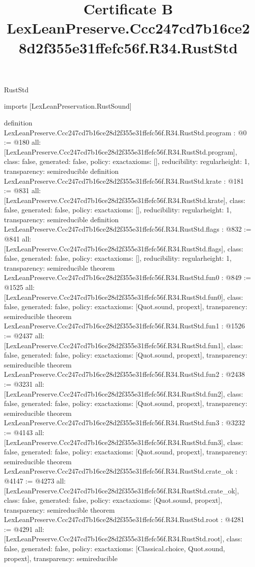 \begin{lexlean}{RustStd}
\title{Certificate B LexLeanPreserve.Ccc247cd7b16ce28d2f355e31ffefc56f.R34.RustStd}
\begin{coremodule}
imports [LexLeanPreservation.RustSound]

definition LexLeanPreserve.Ccc247cd7b16ce28d2f355e31ffefc56f.R34.RustStd.program : @0 := @180 {
  all: [LexLeanPreserve.Ccc247cd7b16ce28d2f355e31ffefc56f.R34.RustStd.program],
  class: false,
  generated: false,
  policy: exact{axioms: []},
  reducibility: regular{height: 1},
  transparency: semireducible
}
definition LexLeanPreserve.Ccc247cd7b16ce28d2f355e31ffefc56f.R34.RustStd.krate : @181 := @831 {
  all: [LexLeanPreserve.Ccc247cd7b16ce28d2f355e31ffefc56f.R34.RustStd.krate],
  class: false,
  generated: false,
  policy: exact{axioms: []},
  reducibility: regular{height: 1},
  transparency: semireducible
}
definition LexLeanPreserve.Ccc247cd7b16ce28d2f355e31ffefc56f.R34.RustStd.flags : @832 := @841 {
  all: [LexLeanPreserve.Ccc247cd7b16ce28d2f355e31ffefc56f.R34.RustStd.flags],
  class: false,
  generated: false,
  policy: exact{axioms: []},
  reducibility: regular{height: 1},
  transparency: semireducible
}
theorem LexLeanPreserve.Ccc247cd7b16ce28d2f355e31ffefc56f.R34.RustStd.fun0 : @849 := @1525 {
  all: [LexLeanPreserve.Ccc247cd7b16ce28d2f355e31ffefc56f.R34.RustStd.fun0],
  class: false,
  generated: false,
  policy: exact{axioms: [Quot.sound, propext]},
  transparency: semireducible
}
theorem LexLeanPreserve.Ccc247cd7b16ce28d2f355e31ffefc56f.R34.RustStd.fun1 : @1526 := @2437 {
  all: [LexLeanPreserve.Ccc247cd7b16ce28d2f355e31ffefc56f.R34.RustStd.fun1],
  class: false,
  generated: false,
  policy: exact{axioms: [Quot.sound, propext]},
  transparency: semireducible
}
theorem LexLeanPreserve.Ccc247cd7b16ce28d2f355e31ffefc56f.R34.RustStd.fun2 : @2438 := @3231 {
  all: [LexLeanPreserve.Ccc247cd7b16ce28d2f355e31ffefc56f.R34.RustStd.fun2],
  class: false,
  generated: false,
  policy: exact{axioms: [Quot.sound, propext]},
  transparency: semireducible
}
theorem LexLeanPreserve.Ccc247cd7b16ce28d2f355e31ffefc56f.R34.RustStd.fun3 : @3232 := @4143 {
  all: [LexLeanPreserve.Ccc247cd7b16ce28d2f355e31ffefc56f.R34.RustStd.fun3],
  class: false,
  generated: false,
  policy: exact{axioms: [Quot.sound, propext]},
  transparency: semireducible
}
theorem LexLeanPreserve.Ccc247cd7b16ce28d2f355e31ffefc56f.R34.RustStd.crate_ok : @4147 := @4273 {
  all: [LexLeanPreserve.Ccc247cd7b16ce28d2f355e31ffefc56f.R34.RustStd.crate_ok],
  class: false,
  generated: false,
  policy: exact{axioms: [Quot.sound, propext]},
  transparency: semireducible
}
theorem LexLeanPreserve.Ccc247cd7b16ce28d2f355e31ffefc56f.R34.RustStd.root : @4281 := @4291 {
  all: [LexLeanPreserve.Ccc247cd7b16ce28d2f355e31ffefc56f.R34.RustStd.root],
  class: false,
  generated: false,
  policy: exact{axioms: [Classical.choice, Quot.sound, propext]},
  transparency: semireducible
}


\end{coremodule}
\end{lexlean}

